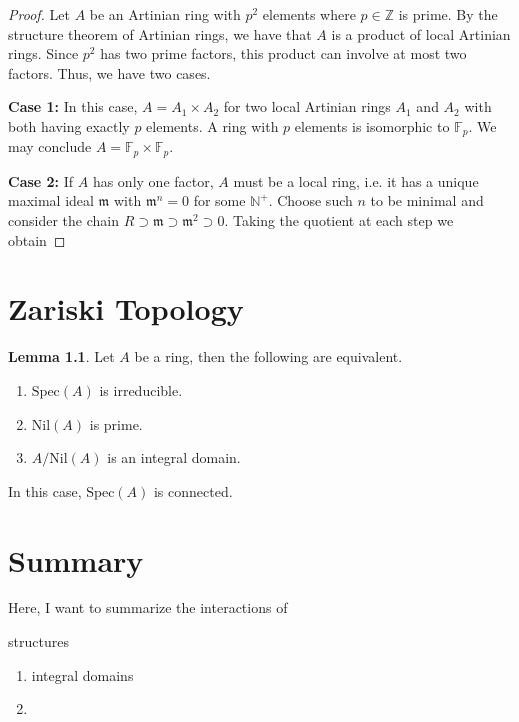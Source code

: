 \documentclass[a4paper]{book}
\theoremstyle{definition}
\newtheorem{lemma}[definition]{Lemma}
\begin{document}
\begin{proof}
    Let \(A\) be an Artinian ring with \(p^2\) elements where \(p \in \mathbb{Z}\) is prime. By the structure theorem of Artinian rings, we have that \(A\) is a product of local Artinian rings. Since \(p^2\) has two prime factors, this product can involve at most two factors. Thus, we have two cases.

    \textbf{Case 1:} In this case, \(A = A_1 \times A_2\) for two local Artinian rings \(A_1\) and \(A_2\) with both having exactly \(p\) elements. A ring with \(p\) elements is isomorphic to \(\mathbb{F}_p\). We may conclude \(A = \mathbb{F}_p \times \mathbb{F}_p\).

    \textbf{Case 2:} If \(A\) has only one factor, \(A\) must be a local ring, i.e. it has a unique maximal ideal \(\mathfrak{m}\) with \(\mathfrak{m}^n = 0\) for some \(\mathbb{N}^+\). Choose such \(n\) to be minimal and consider the chain \(R \supset \mathfrak{m} \supset \mathfrak{m}^2 \supset 0\). Taking the quotient at each step we obtain 
\end{proof}

\chapter{Zariski Topology}

\begin{thmbox}
    \begin{lemma}
        Let \(A\) be a ring, then the following are equivalent.
        \begin{enumerate}
            \item \(\mathrm{Spec}(A)\) is irreducible.
            \item \(\mathrm{Nil}(A)\) is prime.
            \item \(A / \mathrm{Nil}(A)\) is an integral domain.
        \end{enumerate}
        In this case, \(\mathrm{Spec}(A)\) is connected.
    \end{lemma}
\end{thmbox}

\chapter{Summary}

Here, I want to summarize the interactions of

structures
\begin{enumerate}
    \item integral domains
    \item 
\end{enumerate}
\end{document}
